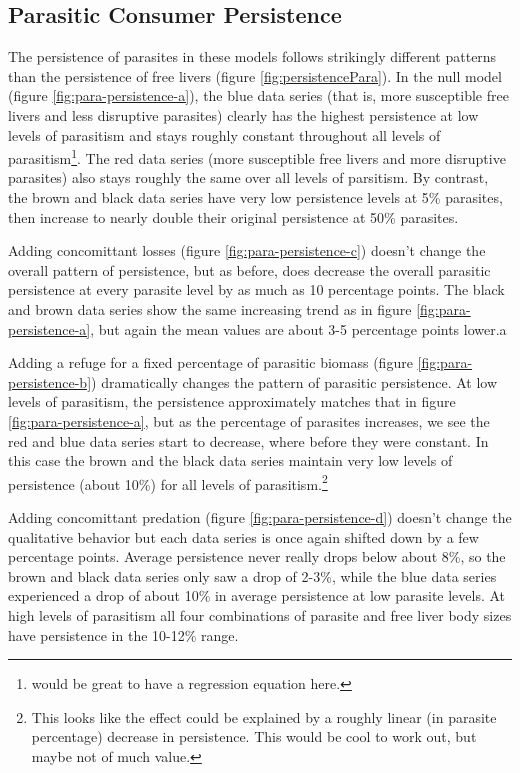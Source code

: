\documentclass[11pt]{amsart}
\begin{document}
\subsection{Parasitic Consumer Persistence \label{sec:persistencePara}}

The persistence of parasites in these models follows strikingly different patterns than the persistence of free livers (figure \ref{fig:persistencePara}).  In the null model (figure \ref{fig:para-persistence-a}), the blue data series (that is, more susceptible free livers and less disruptive parasites) clearly has the highest persistence at low levels of parasitism and stays roughly constant throughout all levels of parasitism\footnote{would be great to have a regression equation here.}.  The red data series (more susceptible free livers and more disruptive parasites) also stays roughly the same over all levels of parsitism.   By contrast, the brown and black data series have very low persistence levels at 5\% parasites, then increase to nearly double their original persistence at 50\% parasites.

Adding concomittant losses (figure \ref{fig:para-persistence-c}) doesn't change the overall pattern of persistence, but as before, does decrease the overall parasitic persistence at every parasite level by as much as 10 percentage points.  The black and brown data series show the same increasing trend as in figure \ref{fig:para-persistence-a}, but again the mean values are about 3-5 percentage points lower.a

Adding a refuge for a fixed percentage of parasitic biomass (figure \ref{fig:para-persistence-b}) dramatically changes the pattern of parasitic persistence.  At low levels of parasitism, the persistence approximately matches that in figure \ref{fig:para-persistence-a}, but as the percentage of parasites increases, we see the red and blue data series start to decrease, where before they were constant.  In this case the brown and the black data series maintain very low levels of persistence (about 10\%) for all levels of parasitism.\footnote{This looks like the effect could be explained by a roughly linear (in parasite percentage) decrease in persistence.  This would be cool to work out, but maybe not of much value.}

  Adding concomittant predation (figure \ref{fig:para-persistence-d}) doesn't change the qualitative behavior but each data series is once again shifted down by a few percentage points.  Average persistence never really drops below about 8\%, so the brown and black data series only saw a drop of 2-3\%, while the blue data series experienced a drop of about 10\% in average persistence at low parasite levels.  At high levels of parasitism all four combinations of parasite and free liver body sizes have persistence in the 10-12\% range.
\end{document}
